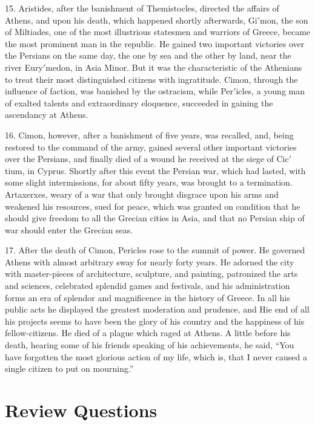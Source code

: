 \documentclass[openany,a4paper]{memoir}
\begin{document}
15. Aristides, after the banishment of Themistocles, directed 
the affairs of Athens, and upon his death, which happened 
shortly afterwards, Gi$'$mon, the son of Miltiades, one of the 
most illustrious statesmen and warriors of Greece, became 
the most prominent man in the republic. He gained two 
important victories over the Persians on the same day, the 
one by sea and the other by land, near the river Eury$'$medon, 
in Asia Minor. But it was the characteristic of the Athenians to treat their most distinguished citizens with ingratitude. Cimon, through the influence of faction, was banished 
by the ostracism, while Per$'$icles, a young man of exalted 
talents and extraordinary eloquence, succeeded in gaining the 
ascendancy at Athens. 

16. Cimon, however, after a banishment of five years, was 
recalled, and, being restored to the command of the army, 
gained several other important victories over the Persians, 
and finally died of a wound he received at the siege of Cic$'$tium, in Cyprus. Shortly after this event the Persian war, 
which had lasted, with some slight intermissions, for about 
fifty years, was brought to a termination. Artaxerxes, weary 
of a war that only brought disgrace upon his arms and 
weakened his resources, sued for peace, which was granted 
on condition that he should give freedom to all the Grecian 
cities in Asia, and that no Persian ship of war should enter 
the Grecian seas. 

17. After the death of Cimon, Pericles rose to the summit 
of power. He governed Athens with almost arbitrary sway 
for nearly forty years. He adorned the city with master-pieces 
of architecture, sculpture, and painting, patronized the arts 
and sciences, celebrated splendid games and festivals, and 
his administration forms an era of splendor and magnificence 
in the history of Greece. In all his public acts he displayed 
the greatest moderation and prudence, and Hie end of all his 
projects seems to have been the glory of his country and the 
happiness of his fellow-citizens. He died of a plague which 
raged at Athens. A little before his death, hearing some of 
his friends speaking of his achievements, he said, ``You have 
forgotten the most glorious action of my life, which is, that 
I never caused a single citizen to put on mourning.''


\section{Review Questions}
\end{document}
